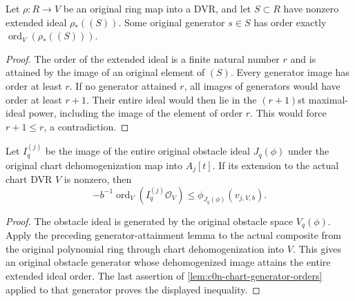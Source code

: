 \begin{lemma}
\label{lem:c0n-chart-original-generator-order}
\leanok
Let $\rho:R\to V$ be an original ring map into a DVR, and let $S\subset R$
have nonzero extended ideal $\rho_*((S))$.  Some original generator
$s\in S$ has order exactly $\operatorname{ord}_V(\rho_*((S)))$.
\end{lemma}
\begin{proof}
The order of the extended ideal is a finite natural number $r$ and is
attained by the image of an original element of $(S)$.
Every generator image has order at least $r$.  If no generator attained
$r$, all images of generators would have order at least $r+1$.
Their entire ideal would then lie in the $(r+1)$st maximal-ideal power,
including the image of the element of order $r$.  This would force
$r+1\le r$, a contradiction.
\end{proof}

\begin{lemma}
\label{lem:c0n-chart-obstacle-ideal-order}
\leanok
Let $I_q^{(j)}$ be the image of the entire original obstacle ideal $J_q(\phi)$
under the original chart dehomogenization map into $A_j[t]$.
If its extension to the actual chart DVR $V$ is nonzero, then
\[
 -b^{-1}\operatorname{ord}_V(I_q^{(j)}\mathcal O_V)
 \le \phi_{J_q(\phi)}(v_{j,V,b}).
\]
\end{lemma}
\begin{proof}
The obstacle ideal is generated by the original obstacle space
$V_q(\phi)$.  Apply the preceding generator-attainment lemma to the actual
composite from the original polynomial ring through chart
dehomogenization into $V$.  This gives an original obstacle generator
whose dehomogenized image attains the entire extended ideal order.
The last assertion of \cref{lem:c0n-chart-generator-orders} applied to
that generator proves the displayed inequality.
\end{proof}


